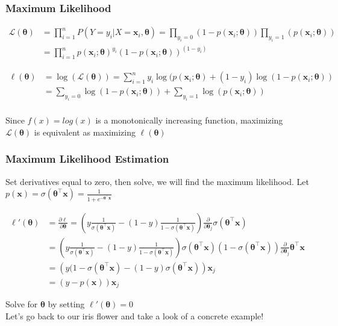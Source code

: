 \begin{frame}
\frametitle{Maximum Likelihood}

\begin{equation}
\begin{aligned}
\mathcal{L}(\bm{\theta}) &= \prod_{i=1}^n P(Y = y_{i}  | X = \mathbf{x}_{i}, \bm{\theta}) = \prod_{y_{i} = 0 } (1-p(\mathbf{x}_{i}; \bm{\theta})) \prod_{y_{i} = 1 } (p(\mathbf{x}_{i}; \bm{\theta})) \\
&= \prod_{i=1}^{n} p(\mathbf{x}_{i}; \bm{\theta})^{y_{i} }(1-p(\mathbf{x}_{i}; \bm{\theta}))^{(1-{y_{i}})}
\end{aligned}
\end{equation}

\begin{equation}
\begin{aligned}
\ell (\bm{\theta}) &=  \log (\mathcal{L}(\bm{\theta}) ) = \sum_{i=1}^{n} y_{i} \log(p(\mathbf{x}_{i}; \bm{\theta}) + (1-y_{i}) \log(1-p(\mathbf{x}_{i}; \bm{\theta})) \\
&= \sum_{y_{i} = 0 } \log (1-p(\mathbf{x}_{i}; \bm{\theta})) + \sum_{y_{i} = 1} \log (p(\mathbf{x}_{i}; \bm{\theta})) \\
\end{aligned}
\end{equation}

Since $f(x) = log(x)$ is a monotonically increasing function, maximizing $\mathcal{L}(\bm{\theta})$ is equivalent as maximizing $\ell(\bm{\theta})$
\end{frame}
\begin{frame}
\frametitle{Maximum Likelihood Estimation}
Set derivatives equal to zero, then solve, we will find the maximum likelihood.
Let $p(\mathbf{x}) = \sigma(\bm{\theta}^{\intercal} \mathbf{x}) = \frac{1}{1+ e^{-\bm{\theta}^{\intercal} \mathbf{x}}}$

\begin{equation}
\begin{aligned}
\ell'(\bm{\theta}) 
&= \frac{\partial \ell}{\partial \bm{\theta}} =\left(y \frac{1}{\sigma(\bm{\theta}^{\intercal} \mathbf{x})} - (1-y) \frac{1}{1-\sigma(\bm{\theta}^{\intercal} \mathbf{x})}\right) 
\frac{\partial }{\partial \bm{\theta}_{j}} \sigma(\bm{\theta}^{\intercal} \mathbf{x}) \\
&= \left(y \frac{1}{\sigma(\bm{\theta}^{\intercal} \mathbf{x})} - (1-y) \frac{1}{1-\sigma(\bm{\theta}^{\intercal} \mathbf{x})}\right) 
\sigma(\bm{\theta}^{\intercal} \mathbf{x})(1-\sigma(\bm{\theta}^{\intercal} \mathbf{x})) 
\frac{\partial }{\partial \bm{\theta}_{j}} \bm{\theta}^{\intercal} \mathbf{x} \\
&= \left(y(1-\sigma(\bm{\theta}^{\intercal} \mathbf{x}) - (1-y) \sigma(\bm{\theta}^{\intercal} \mathbf{x}) \right) \mathbf{x}_{j} \\
&= (y - p(\mathbf{x}))\mathbf{x}_{j}
\end{aligned}
\end{equation}

Solve for $\bm{\theta}$ by setting $\ell'(\bm{\theta}) =0$ \\
Let's go back to our iris flower and take a look of a concrete example!
\end{frame}
